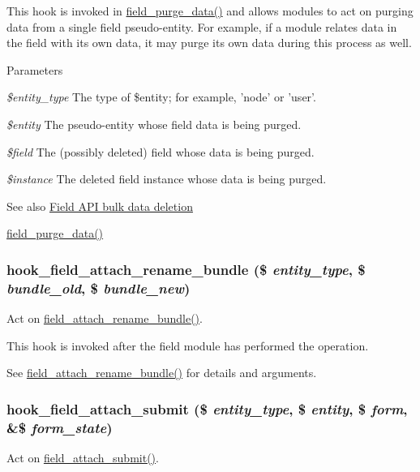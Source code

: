 This hook is invoked in \hyperlink{group__field__purge_ga93ec2f273b56141a5079bfaf25d6b80e}{field\_\-purge\_\-data()} and allows modules to act on purging data from a single field pseudo-\/entity. For example, if a module relates data in the field with its own data, it may purge its own data during this process as well.


\begin{DoxyParams}{Parameters}
\item[{\em \$entity\_\-type}]The type of \$entity; for example, 'node' or 'user'. \item[{\em \$entity}]The pseudo-\/entity whose field data is being purged. \item[{\em \$field}]The (possibly deleted) field whose data is being purged. \item[{\em \$instance}]The deleted field instance whose data is being purged.\end{DoxyParams}
\begin{DoxySeeAlso}{See also}
\hyperlink{group__field__purge}{Field API bulk data deletion } 

\hyperlink{group__field__purge_ga93ec2f273b56141a5079bfaf25d6b80e}{field\_\-purge\_\-data()} 
\end{DoxySeeAlso}
\hypertarget{group__field__attach_gaf218d913150bda6004d5d8e112d3174a}{
\subsubsection[{hook\_\-field\_\-attach\_\-rename\_\-bundle}]{\setlength{\rightskip}{0pt plus 5cm}hook\_\-field\_\-attach\_\-rename\_\-bundle (\$ {\em entity\_\-type}, \/  \$ {\em bundle\_\-old}, \/  \$ {\em bundle\_\-new})}}
\label{group__field__attach_gaf218d913150bda6004d5d8e112d3174a}
Act on \hyperlink{group__field__attach_ga25bffa83f84504c834d27b2126f58f51}{field\_\-attach\_\-rename\_\-bundle()}.

This hook is invoked after the field module has performed the operation.

See \hyperlink{group__field__attach_ga25bffa83f84504c834d27b2126f58f51}{field\_\-attach\_\-rename\_\-bundle()} for details and arguments. \hypertarget{group__field__attach_ga368ea58ca800b1e1f69f4b88e82f9ae0}{
\subsubsection[{hook\_\-field\_\-attach\_\-submit}]{\setlength{\rightskip}{0pt plus 5cm}hook\_\-field\_\-attach\_\-submit (\$ {\em entity\_\-type}, \/  \$ {\em entity}, \/  \$ {\em form}, \/  \&\$ {\em form\_\-state})}}
\label{group__field__attach_ga368ea58ca800b1e1f69f4b88e82f9ae0}
Act on \hyperlink{group__field__attach_ga756e59f651aa870ee79dd488b4e799c8}{field\_\-attach\_\-submit()}.

